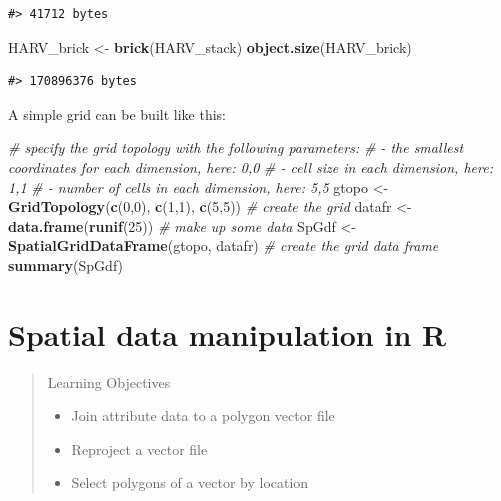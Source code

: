 \documentclass[]{book}
\newenvironment{Shaded}{\begin{snugshade}}{\end{snugshade}}
\newcommand{\KeywordTok}[1]{\textcolor[rgb]{0.13,0.29,0.53}{\textbf{#1}}}
\newcommand{\DecValTok}[1]{\textcolor[rgb]{0.00,0.00,0.81}{#1}}
\newcommand{\StringTok}[1]{\textcolor[rgb]{0.31,0.60,0.02}{#1}}
\newcommand{\CommentTok}[1]{\textcolor[rgb]{0.56,0.35,0.01}{\textit{#1}}}
\newcommand{\NormalTok}[1]{#1}
\providecommand{\tightlist}{%
  \setlength{\itemsep}{0pt}\setlength{\parskip}{0pt}}
\theoremstyle{definition}
\theoremstyle{definition}
\theoremstyle{definition}
\theoremstyle{remark}
\begin{document}
\begin{verbatim}
#> 41712 bytes
\end{verbatim}

\begin{Shaded}
\begin{Highlighting}[]
\NormalTok{HARV_brick <-}\StringTok{ }\KeywordTok{brick}\NormalTok{(HARV_stack)}
\KeywordTok{object.size}\NormalTok{(HARV_brick)}
\end{Highlighting}
\end{Shaded}

\begin{verbatim}
#> 170896376 bytes
\end{verbatim}

A simple grid can be built like this:

\begin{Shaded}
\begin{Highlighting}[]
\CommentTok{# specify the grid topology with the following parameters:}
\CommentTok{# - the smallest coordinates for each dimension, here: 0,0}
\CommentTok{# - cell size in each dimension, here: 1,1 }
\CommentTok{# - number of cells in each dimension, here: 5,5}
\NormalTok{gtopo <-}\StringTok{ }\KeywordTok{GridTopology}\NormalTok{(}\KeywordTok{c}\NormalTok{(}\DecValTok{0}\NormalTok{,}\DecValTok{0}\NormalTok{), }\KeywordTok{c}\NormalTok{(}\DecValTok{1}\NormalTok{,}\DecValTok{1}\NormalTok{), }\KeywordTok{c}\NormalTok{(}\DecValTok{5}\NormalTok{,}\DecValTok{5}\NormalTok{)) }\CommentTok{# create the grid}
\NormalTok{datafr <-}\StringTok{ }\KeywordTok{data.frame}\NormalTok{(}\KeywordTok{runif}\NormalTok{(}\DecValTok{25}\NormalTok{)) }\CommentTok{# make up some data}
\NormalTok{SpGdf <-}\StringTok{ }\KeywordTok{SpatialGridDataFrame}\NormalTok{(gtopo, datafr) }\CommentTok{# create the grid data frame}
\KeywordTok{summary}\NormalTok{(SpGdf)}
\end{Highlighting}
\end{Shaded}

\chapter{Spatial data manipulation in R}\label{spatialops}

\begin{quote}
Learning Objectives

\begin{itemize}
\tightlist
\item
  Join attribute data to a polygon vector file
\item
  Reproject a vector file
\item
  Select polygons of a vector by location
\end{itemize}
\end{quote}
\end{document}

